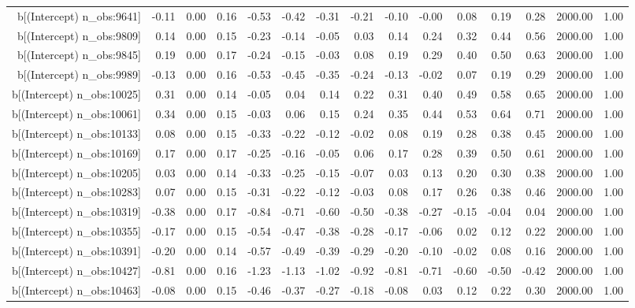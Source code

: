 \begin{table}[ht]
\begin{tabular}{rrrrrrrrrrrrrrr}
  b[(Intercept) n\_obs:9641] & -0.11 & 0.00 & 0.16 & -0.53 & -0.42 & -0.31 & -0.21 & -0.10 & -0.00 & 0.08 & 0.19 & 0.28 & 2000.00 & 1.00 \\ 
  b[(Intercept) n\_obs:9809] & 0.14 & 0.00 & 0.15 & -0.23 & -0.14 & -0.05 & 0.03 & 0.14 & 0.24 & 0.32 & 0.44 & 0.56 & 2000.00 & 1.00 \\ 
  b[(Intercept) n\_obs:9845] & 0.19 & 0.00 & 0.17 & -0.24 & -0.15 & -0.03 & 0.08 & 0.19 & 0.29 & 0.40 & 0.50 & 0.63 & 2000.00 & 1.00 \\ 
  b[(Intercept) n\_obs:9989] & -0.13 & 0.00 & 0.16 & -0.53 & -0.45 & -0.35 & -0.24 & -0.13 & -0.02 & 0.07 & 0.19 & 0.29 & 2000.00 & 1.00 \\ 
  b[(Intercept) n\_obs:10025] & 0.31 & 0.00 & 0.14 & -0.05 & 0.04 & 0.14 & 0.22 & 0.31 & 0.40 & 0.49 & 0.58 & 0.65 & 2000.00 & 1.00 \\ 
  b[(Intercept) n\_obs:10061] & 0.34 & 0.00 & 0.15 & -0.03 & 0.06 & 0.15 & 0.24 & 0.35 & 0.44 & 0.53 & 0.64 & 0.71 & 2000.00 & 1.00 \\ 
  b[(Intercept) n\_obs:10133] & 0.08 & 0.00 & 0.15 & -0.33 & -0.22 & -0.12 & -0.02 & 0.08 & 0.19 & 0.28 & 0.38 & 0.45 & 2000.00 & 1.00 \\ 
  b[(Intercept) n\_obs:10169] & 0.17 & 0.00 & 0.17 & -0.25 & -0.16 & -0.05 & 0.06 & 0.17 & 0.28 & 0.39 & 0.50 & 0.61 & 2000.00 & 1.00 \\ 
  b[(Intercept) n\_obs:10205] & 0.03 & 0.00 & 0.14 & -0.33 & -0.25 & -0.15 & -0.07 & 0.03 & 0.13 & 0.20 & 0.30 & 0.38 & 2000.00 & 1.00 \\ 
  b[(Intercept) n\_obs:10283] & 0.07 & 0.00 & 0.15 & -0.31 & -0.22 & -0.12 & -0.03 & 0.08 & 0.17 & 0.26 & 0.38 & 0.46 & 2000.00 & 1.00 \\ 
  b[(Intercept) n\_obs:10319] & -0.38 & 0.00 & 0.17 & -0.84 & -0.71 & -0.60 & -0.50 & -0.38 & -0.27 & -0.15 & -0.04 & 0.04 & 2000.00 & 1.00 \\ 
  b[(Intercept) n\_obs:10355] & -0.17 & 0.00 & 0.15 & -0.54 & -0.47 & -0.38 & -0.28 & -0.17 & -0.06 & 0.02 & 0.12 & 0.22 & 2000.00 & 1.00 \\ 
  b[(Intercept) n\_obs:10391] & -0.20 & 0.00 & 0.14 & -0.57 & -0.49 & -0.39 & -0.29 & -0.20 & -0.10 & -0.02 & 0.08 & 0.16 & 2000.00 & 1.00 \\ 
  b[(Intercept) n\_obs:10427] & -0.81 & 0.00 & 0.16 & -1.23 & -1.13 & -1.02 & -0.92 & -0.81 & -0.71 & -0.60 & -0.50 & -0.42 & 2000.00 & 1.00 \\ 
  b[(Intercept) n\_obs:10463] & -0.08 & 0.00 & 0.15 & -0.46 & -0.37 & -0.27 & -0.18 & -0.08 & 0.03 & 0.12 & 0.22 & 0.30 & 2000.00 & 1.00 \\ 

\end{tabular}
\end{table}
